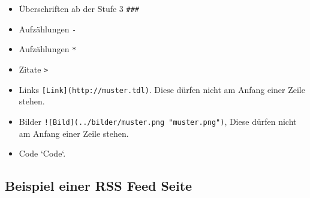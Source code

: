 \documentclass[%
fontsize=12pt,%
parskip=half,%
version=last%
]{scrreprt}
\begin{document}
\begin{itemize}
\itemsep1pt\parskip0pt
\item
  Überschriften ab der Stufe 3 \texttt{\#\#\#}
\item
  Aufzählungen \texttt{-}
\item
  Aufzählungen \texttt{*}
\item
  Zitate \texttt{\textgreater{}}
\item
  Links \texttt{{[}Link{]}(http://muster.tdl)}. Diese dürfen nicht am
  Anfang einer Zeile stehen.
\item
  Bilder \texttt{!{[}Bild{]}(../bilder/muster.png "muster.png")}, Diese
  dürfen nicht am Anfang einer Zeile stehen.
\item
  Code `Code`.
\end{itemize}

\subsection{Beispiel einer RSS Feed
Seite}\label{beispiel-einer-rss-feed-seite}

% 
% 
% 
% 
% 
\end{document}
